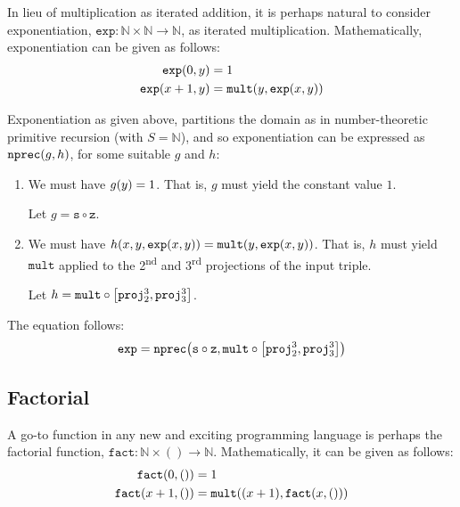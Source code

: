 In lieu of multiplication as iterated addition, it is perhaps natural to
consider exponentiation, $\mathtt{exp} : \mathbb{N} \times \mathbb{N}
\rightarrow \mathbb{N}$, as iterated multiplication.  Mathematically,
exponentiation can be given as follows:\begin{align*}
%
\mathtt{exp}\p{0, y} &= 1 \\
%
\mathtt{exp}\p{x+1, y} &= \mathtt{mult}\p{y, \mathtt{exp}\p{x,y}}
%
\end{align*}

Exponentiation as given above, partitions the domain as in number-theoretic
primitive recursion (with $S = \mathbb{N}$), and so exponentiation can be
expressed as $\mathtt{nprec}{\mathopen{}\left({g,h}\right)\mathclose{}}$, for some suitable $g$ and $h$:

\begin{enumerate}[label=(\arabic*)]

\item We must have $g{\mathopen{}\left({y}\right)\mathclose{}} = 1$. That is, $g$ must yield the constant value $1$.

Let $g = \mathtt{s} \circ \mathtt{z}$.

\item We must have $h{\mathopen{}\left({x,y,\mathtt{exp}{\mathopen{}\left({x,y}\right)\mathclose{}}}\right)\mathclose{}} = \mathtt{mult}{\mathopen{}\left({y,
\mathtt{exp}{\mathopen{}\left({x,y}\right)\mathclose{}}}\right)\mathclose{}}$. That is, $h$ must yield $\mathtt{mult}$ applied to the
2\textsuperscript{nd} and 3\textsuperscript{rd} projections of the input
triple.

Let $h = \mathtt{mult} \circ \mathopen{}\left[{\mathtt{proj}^3_2,\mathtt{proj}^3_3}\right]\mathclose{}$.

\end{enumerate}

The equation follows:\begin{align*}
%
\mathtt{exp} = \mathtt{nprec}\p{\mathtt{s} \circ \mathtt{z}, \mathtt{mult}
\circ \seq{\mathtt{proj}^3_2, \mathtt{proj}^3_3}}
%
\end{align*}

\subsection{Factorial}

A go-to function in any new and exciting programming language is perhaps the
factorial function, $\mathtt{fact} : \mathbb{N} \times () \rightarrow
\mathbb{N}$.  Mathematically, it can be given as follows:\begin{align*}
%
\mathtt{fact}\p{0,()} &= 1 \\
%
\mathtt{fact}\p{x+1,()} &= \mathtt{mult}\p{\p{x+1}, \mathtt{fact}\p{x,()}}
%
\end{align*}

